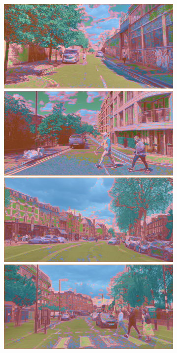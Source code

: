\begin{figure}[H]
\begin{subfigure}[t]{.32\textwidth}
		\includegraphics[width=\textwidth]{city_images/HackneyScapes/Hackney3164_baseline.png} \\[5pt]
		\includegraphics[width=\textwidth]{city_images/HackneyScapes/Hackney3173_baseline.png} \\[5pt]
		\includegraphics[width=\textwidth]{city_images/HackneyScapes/Hackney3204_baseline.png} \\[5pt]
		\includegraphics[width=\textwidth]{city_images/HackneyScapes/Hackney3210_baseline.png}

\end{subfigure}
\end{figure}
